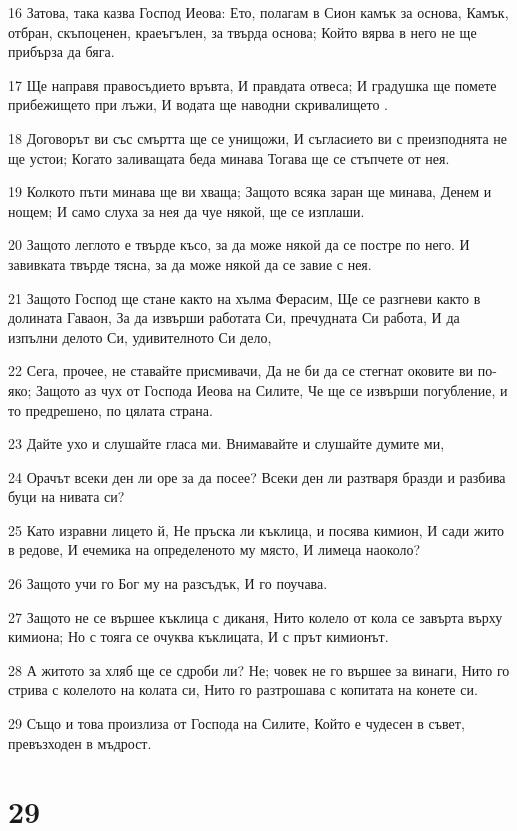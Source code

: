 \par 16 Затова, така казва Господ Иеова: Ето, полагам в Сион камък за основа, Камък, отбран, скъпоценен, краеъгълен, за твърда основа; Който вярва в него не ще прибърза да бяга.
\par 17 Ще направя правосъдието връвта, И правдата отвеса; И градушка ще помете прибежището при лъжи, И водата ще наводни скривалището .
\par 18 Договорът ви със смъртта ще се унищожи, И съгласието ви с преизподнята не ще устои; Когато заливащата беда минава Тогава ще се стъпчете от нея.
\par 19 Колкото пъти минава ще ви хваща; Защото всяка заран ще минава, Денем и нощем; И само слуха за нея да чуе някой, ще се изплаши.
\par 20 Защото леглото е твърде късо, за да може някой да се постре по него. И завивката твърде тясна, за да може някой да се завие с нея.
\par 21 Защото Господ ще стане както на хълма Ферасим, Ще се разгневи както в долината Гаваон, За да извърши работата Си, пречудната Си работа, И да изпълни делото Си, удивителното Си дело,
\par 22 Сега, прочее, не ставайте присмивачи, Да не би да се стегнат оковите ви по-яко; Защото аз чух от Господа Иеова на Силите, Че ще се извърши погубление, и то предрешено, по цялата страна.
\par 23 Дайте ухо и слушайте гласа ми. Внимавайте и слушайте думите ми,
\par 24 Орачът всеки ден ли оре за да посее? Всеки ден ли разтваря бразди и разбива буци на нивата си?
\par 25 Като изравни лицето й, Не пръска ли къклица, и посява кимион, И сади жито в редове, И ечемика на определеното му място, И лимеца наоколо?
\par 26 Защото учи го Бог му на разсъдък, И го поучава.
\par 27 Защото не се вършее къклица с диканя, Нито колело от кола се завърта върху кимиона; Но с тояга се очуква къклицата, И с прът кимионът.
\par 28 А житото за хляб ще се сдроби ли? Не; човек не го вършее за винаги, Нито го стрива с колелото на колата си, Нито го разтрошава с копитата на конете си.
\par 29 Също и това произлиза от Господа на Силите, Който е чудесен в съвет, превъзходен в мъдрост.

\chapter{29}

